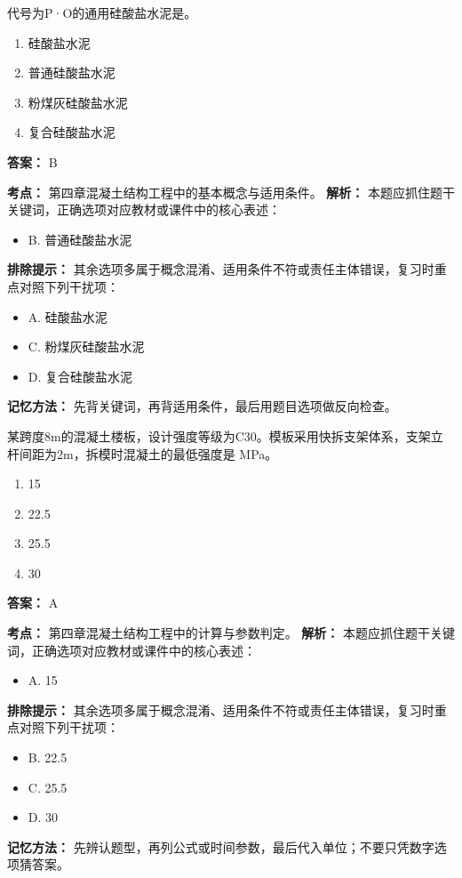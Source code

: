 \documentclass[UTF8,fontset=fandol,11pt]{ctexart}
\begin{document}
\begin{quizbox}[title={第 36 题}]
代号为P·O的通用硅酸盐水泥是。\\
\begin{enumerate}[label=\Alph*.]
\item 硅酸盐水泥
\item 普通硅酸盐水泥
\item 粉煤灰硅酸盐水泥
\item 复合硅酸盐水泥
\end{enumerate}
\textbf{答案：} B
\vspace{0.25em}
\begin{answerbox}[title={考点解析}]
\textbf{考点：} 第四章混凝土结构工程中的基本概念与适用条件。
\textbf{解析：} 本题应抓住题干关键词，正确选项对应教材或课件中的核心表述：
\begin{itemize}
\item B. 普通硅酸盐水泥
\end{itemize}
\textbf{排除提示：} 其余选项多属于概念混淆、适用条件不符或责任主体错误，复习时重点对照下列干扰项：
\begin{itemize}
\item A. 硅酸盐水泥
\item C. 粉煤灰硅酸盐水泥
\item D. 复合硅酸盐水泥
\end{itemize}
\textbf{记忆方法：} 先背关键词，再背适用条件，最后用题目选项做反向检查。
\end{answerbox}
\end{quizbox}

\begin{quizbox}[title={第 37 题}]
某跨度8m的混凝土楼板，设计强度等级为C30。模板采用快拆支架体系，支架立杆间距为2m，拆模时混凝土的最低强度是 MPa。\\
\begin{enumerate}[label=\Alph*.]
\item 15
\item 22.5
\item 25.5
\item 30
\end{enumerate}
\textbf{答案：} A
\vspace{0.25em}
\begin{answerbox}[title={考点解析}]
\textbf{考点：} 第四章混凝土结构工程中的计算与参数判定。
\textbf{解析：} 本题应抓住题干关键词，正确选项对应教材或课件中的核心表述：
\begin{itemize}
\item A. 15
\end{itemize}
\textbf{排除提示：} 其余选项多属于概念混淆、适用条件不符或责任主体错误，复习时重点对照下列干扰项：
\begin{itemize}
\item B. 22.5
\item C. 25.5
\item D. 30
\end{itemize}
\textbf{记忆方法：} 先辨认题型，再列公式或时间参数，最后代入单位；不要只凭数字选项猜答案。
\end{answerbox}
\end{quizbox}
\end{document}
